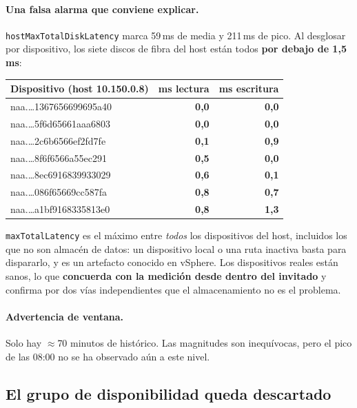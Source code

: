 \documentclass[11pt,a4paper]{article}
\newcommand{\cod}[1]{\texttt{\small #1}}
\newcommand{\bien}[1]{\textcolor{verde}{\textbf{#1}}}
\begin{document}
\paragraph{Una falsa alarma que conviene explicar.}
\cod{hostMaxTotalDiskLatency} marca 59\,ms de media y 211\,ms de pico. Al
desglosar por dispositivo, los siete discos de fibra del host están todos
\textbf{por debajo de 1,5\,ms}:

\begin{table}[h]
\centering
\small
\begin{tabular}{lrr}
\toprule
\textbf{Dispositivo (host 10.150.0.8)} & \textbf{ms lectura} & \textbf{ms escritura} \\
\midrule
naa.\ldots 1367656699695a40 & \bien{0,0} & \bien{0,0} \\
naa.\ldots 5f6d65661aaa6803 & \bien{0,0} & \bien{0,0} \\
naa.\ldots 2c6b6566ef2fd7fe & \bien{0,1} & \bien{0,9} \\
naa.\ldots 8f6f6566a55ec291 & \bien{0,5} & \bien{0,0} \\
naa.\ldots 8ec6916839933029 & \bien{0,6} & \bien{0,1} \\
naa.\ldots 086f65669cc587fa & \bien{0,8} & \bien{0,7} \\
naa.\ldots a1bf9168335813e0 & \bien{0,8} & \bien{1,3} \\
\bottomrule
\end{tabular}
\end{table}

\cod{maxTotalLatency} es el máximo entre \emph{todos} los dispositivos del
host, incluidos los que no son almacén de datos: un dispositivo local o una
ruta inactiva basta para dispararlo, y es un artefacto conocido en vSphere.
Los dispositivos reales están sanos, lo que \textbf{concuerda con la medición
desde dentro del invitado} y confirma por dos vías independientes que el
almacenamiento no es el problema.

\paragraph{Advertencia de ventana.} Solo hay $\approx$70 minutos de
histórico. Las magnitudes son inequívocas, pero el pico de las 08:00 no se ha
observado aún a este nivel.

\subsection{El grupo de disponibilidad queda descartado}
\end{document}
